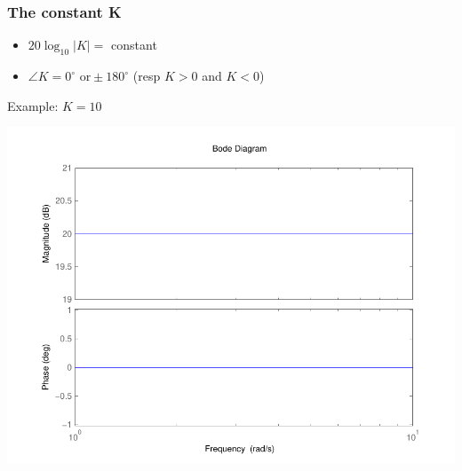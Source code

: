 \begin{frame}
\frametitle{The constant K}
\begin{itemize}
\item $20\log_{10}|K| =$ constant
\item $\angle K = 0^{\circ} \text{ or} \pm 180^{\circ}$  (resp $K > 0$ and $K < 0$)
\end{itemize}
Example: $K = 10$

\begin{center}
\includegraphics[scale=0.45]{BodeConstant}
\end{center}

\end{frame}



